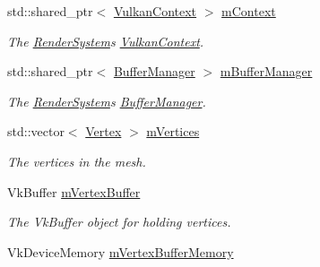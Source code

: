 \begin{DoxyCompactItemize}
\item 
\mbox{\label{class_mesh_ab9973a6da3df09fdf2e82fb7733be4ed}} 
std\+::shared\+\_\+ptr$<$ \mbox{\hyperlink{class_vulkan_context}{Vulkan\+Context}} $>$ \mbox{\hyperlink{class_mesh_ab9973a6da3df09fdf2e82fb7733be4ed}{m\+Context}}
\begin{DoxyCompactList}\small\item\em The \mbox{\hyperlink{class_render_system}{Render\+System}}\textquotesingle{}s \mbox{\hyperlink{class_vulkan_context}{Vulkan\+Context}}. \end{DoxyCompactList}\item 
\mbox{\label{class_mesh_aea2c6a1f1e0e87196c0d7116ccf63088}} 
std\+::shared\+\_\+ptr$<$ \mbox{\hyperlink{class_buffer_manager}{Buffer\+Manager}} $>$ \mbox{\hyperlink{class_mesh_aea2c6a1f1e0e87196c0d7116ccf63088}{m\+Buffer\+Manager}}
\begin{DoxyCompactList}\small\item\em The \mbox{\hyperlink{class_render_system}{Render\+System}}\textquotesingle{}s \mbox{\hyperlink{class_buffer_manager}{Buffer\+Manager}}. \end{DoxyCompactList}\item 
\mbox{\label{class_mesh_a1bad8bb82d9ec131c77b2a8d7d137408}} 
std\+::vector$<$ \mbox{\hyperlink{struct_vertex}{Vertex}} $>$ \mbox{\hyperlink{class_mesh_a1bad8bb82d9ec131c77b2a8d7d137408}{m\+Vertices}}
\begin{DoxyCompactList}\small\item\em The vertices in the mesh. \end{DoxyCompactList}\item 
\mbox{\label{class_mesh_a0a744888ceee36087d343c13bb08234e}} 
Vk\+Buffer \mbox{\hyperlink{class_mesh_a0a744888ceee36087d343c13bb08234e}{m\+Vertex\+Buffer}}
\begin{DoxyCompactList}\small\item\em The Vk\+Buffer object for holding vertices. \end{DoxyCompactList}\item 
\mbox{\label{class_mesh_abd6137f58126f9ed337516486eb872f8}} 
Vk\+Device\+Memory \mbox{\hyperlink{class_mesh_abd6137f58126f9ed337516486eb872f8}{m\+Vertex\+Buffer\+Memory}}

\end{DoxyCompactItemize}
